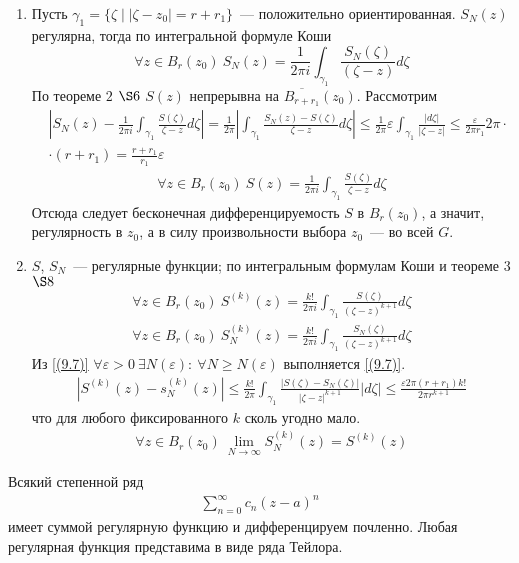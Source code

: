 \begin{enumerate}
    \item Пусть $\gamma_1 = \{\zeta \mid \left| \zeta - z_0 \right| =
    r+r_1\}$~--- положительно ориентированная.
    $S_N(z)$ регулярна, тогда по интегральной формуле Коши
    \begin{equation}\label{(9.9)}
        \forall z \in B_r(z_0) \ S_N(z) = \frac{1}{2 \pi i}\int_{\gamma_1}\frac{S_N(\zeta)}{(\zeta - z)}d \zeta
    \end{equation}
    По теореме $2$ $\S 6$ $S(z)$ непрерывна на $\overline{B_{r+r_1}}(z_0)$.
    Рассмотрим
    \begin{align*}
      & \left| S_N(z) - \frac{1}{2 \pi i}\int_{\gamma_1}\frac{S(\zeta)}{\zeta - z} d\zeta \right| = \frac{1}{2 \pi}\left| \int_{\gamma_1} \frac{S_N(z) - S(\zeta)}{\zeta - z} d \zeta \right| \leq \frac{1}{2 \pi} \varepsilon \int_{\gamma_1}\frac{\left| d \zeta \right|}{\left| \zeta - z \right|} \leq \frac{\varepsilon}{2 \pi r_1}2 \pi \cdot \\
      & \cdot (r+r_1) = \frac{r+r_1}{r_1}\varepsilon
    \end{align*}
    \begin{align*}
      \forall z \in B_r(z_0) \ S(z) = \frac{1}{2\pi i}\int_{\gamma_1}\frac{S(\zeta)}{\zeta - z}d\zeta
    \end{align*}
    Отсюда следует бесконечная дифференцируемость $S$ в $B_r(z_0)$, а значит,
    регулярность в $z_0$, а в силу произвольности выбора $z_0$~--- во всей $G$.
    \item $S$, $S_N$~--- регулярные функции; по интегральным формулам Коши и
    теореме $3$ $\S 8$
    \begin{align*}
      \forall z \in B_r(z_0) \ S^{(k)}(z) = \frac{k!}{2 \pi i} \int_{\gamma_1} \frac{S(\zeta)}{(\zeta - z)^{k+1}}d\zeta
    \end{align*}
    \begin{align*}
      \forall z \in B_r(z_0) \ S_N^{(k)}(z) = \frac{k!}{2 \pi i}\int_{\gamma_1}\frac{S_N(\zeta)}{(\zeta - z)^{k+1}} d \zeta 
    \end{align*}
    Из \eqref{(9.7)} $\forall \varepsilon > 0 \ \exists N(\varepsilon): \
    \forall N\geq N(\varepsilon)$ выполняется \eqref{(9.7)}.
    \begin{align*}
      \left| S^{(k)}(z) - s_N^{(k)}(z) \right| \leq \frac{k!}{2\pi}\int_{\gamma_1}\frac{\left| S(\zeta) - S_N(\zeta) \right|}{\left| \zeta - z \right|^{k+1}} \left| d\zeta \right|\leq \frac{\varepsilon 2 \pi (r+r_1)k!}{2 \pi r^{k+1}}
    \end{align*}
    что для любого фиксированного $k$ сколь угодно мало.
    \begin{align*}
      \forall z \in B_r(z_0) \ \lim_{N \to \infty}S^{(k)}_N (z) = S^{(k)}(z)
    \end{align*}
\end{enumerate}
\corollary
Всякий степенной ряд
\begin{align*}
  \sum_{n=0}^{\infty}c_n(z-a)^n
\end{align*}
имеет суммой регулярную функцию и дифференцируем почленно.
\corollary
Любая регулярная функция представима в виде ряда Тейлора.
